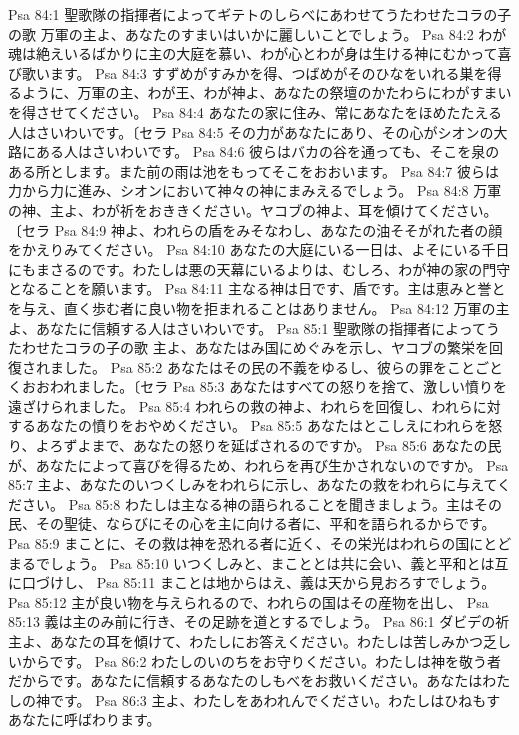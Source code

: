 Psa 84:1  聖歌隊の指揮者によってギテトのしらべにあわせてうたわせたコラの子の歌 万軍の主よ、あなたのすまいはいかに麗しいことでしょう。
Psa 84:2  わが魂は絶えいるばかりに主の大庭を慕い、わが心とわが身は生ける神にむかって喜び歌います。
Psa 84:3  すずめがすみかを得、つばめがそのひなをいれる巣を得るように、万軍の主、わが王、わが神よ、あなたの祭壇のかたわらにわがすまいを得させてください。
Psa 84:4  あなたの家に住み、常にあなたをほめたたえる人はさいわいです。〔セラ
Psa 84:5  その力があなたにあり、その心がシオンの大路にある人はさいわいです。
Psa 84:6  彼らはバカの谷を通っても、そこを泉のある所とします。また前の雨は池をもってそこをおおいます。
Psa 84:7  彼らは力から力に進み、シオンにおいて神々の神にまみえるでしょう。
Psa 84:8  万軍の神、主よ、わが祈をおききください。ヤコブの神よ、耳を傾けてください。〔セラ
Psa 84:9  神よ、われらの盾をみそなわし、あなたの油そそがれた者の顔をかえりみてください。
Psa 84:10  あなたの大庭にいる一日は、よそにいる千日にもまさるのです。わたしは悪の天幕にいるよりは、むしろ、わが神の家の門守となることを願います。
Psa 84:11  主なる神は日です、盾です。主は恵みと誉とを与え、直く歩む者に良い物を拒まれることはありません。
Psa 84:12  万軍の主よ、あなたに信頼する人はさいわいです。
Psa 85:1  聖歌隊の指揮者によってうたわせたコラの子の歌 主よ、あなたはみ国にめぐみを示し、ヤコブの繁栄を回復されました。
Psa 85:2  あなたはその民の不義をゆるし、彼らの罪をことごとくおおわれました。〔セラ
Psa 85:3  あなたはすべての怒りを捨て、激しい憤りを遠ざけられました。
Psa 85:4  われらの救の神よ、われらを回復し、われらに対するあなたの憤りをおやめください。
Psa 85:5  あなたはとこしえにわれらを怒り、よろずよまで、あなたの怒りを延ばされるのですか。
Psa 85:6  あなたの民が、あなたによって喜びを得るため、われらを再び生かされないのですか。
Psa 85:7  主よ、あなたのいつくしみをわれらに示し、あなたの救をわれらに与えてください。
Psa 85:8  わたしは主なる神の語られることを聞きましょう。主はその民、その聖徒、ならびにその心を主に向ける者に、平和を語られるからです。
Psa 85:9  まことに、その救は神を恐れる者に近く、その栄光はわれらの国にとどまるでしょう。
Psa 85:10  いつくしみと、まこととは共に会い、義と平和とは互に口づけし、
Psa 85:11  まことは地からはえ、義は天から見おろすでしょう。
Psa 85:12  主が良い物を与えられるので、われらの国はその産物を出し、
Psa 85:13  義は主のみ前に行き、その足跡を道とするでしょう。
Psa 86:1  ダビデの祈 主よ、あなたの耳を傾けて、わたしにお答えください。わたしは苦しみかつ乏しいからです。
Psa 86:2  わたしのいのちをお守りください。わたしは神を敬う者だからです。あなたに信頼するあなたのしもべをお救いください。あなたはわたしの神です。
Psa 86:3  主よ、わたしをあわれんでください。わたしはひねもすあなたに呼ばわります。
